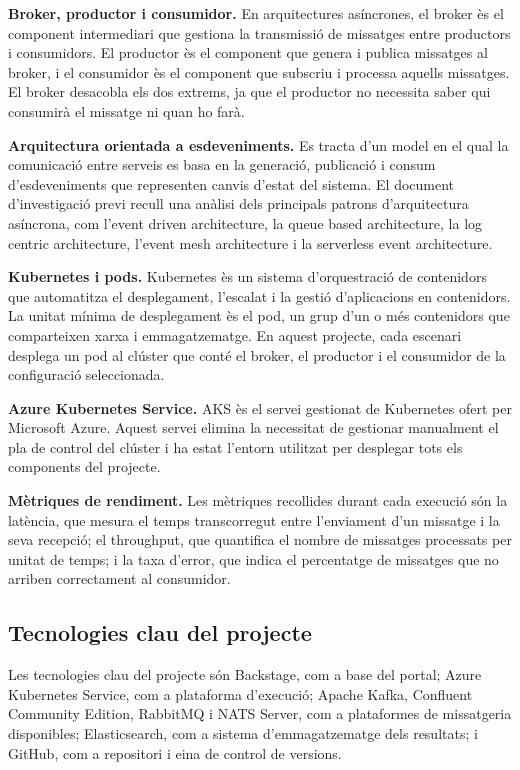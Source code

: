 \documentclass[11pt,a4paper]{article}
\begin{document}
\textbf{Broker, productor i consumidor.} En arquitectures as\'incrones, el broker \`es el component intermediari que gestiona la transmissi\'o de missatges entre productors i consumidors. El productor \`es el component que genera i publica missatges al broker, i el consumidor \`es el component que subscriu i processa aquells missatges. El broker desacobla els dos extrems, ja que el productor no necessita saber qui consumir\`a el missatge ni quan ho far\`a.

\textbf{Arquitectura orientada a esdeveniments.} Es tracta d'un model en el qual la comunicaci\'o entre serveis es basa en la generaci\'o, publicaci\'o i consum d'esdeveniments que representen canvis d'estat del sistema. El document d'investigaci\'o previ recull una an\`alisi dels principals patrons d'arquitectura as\'incrona, com l'event driven architecture, la queue based architecture, la log centric architecture, l'event mesh architecture i la serverless event architecture.

\textbf{Kubernetes i pods.} Kubernetes \`es un sistema d'orquestraci\'o de contenidors que automatitza el desplegament, l'escalat i la gesti\'o d'aplicacions en contenidors. La unitat m\'inima de desplegament \`es el pod, un grup d'un o m\'es contenidors que comparteixen xarxa i emmagatzematge. En aquest projecte, cada escenari desplega un pod al cl\'uster que cont\'e el broker, el productor i el consumidor de la configuraci\'o seleccionada.

\textbf{Azure Kubernetes Service.} AKS \`es el servei gestionat de Kubernetes ofert per Microsoft Azure. Aquest servei elimina la necessitat de gestionar manualment el pla de control del cl\'uster i ha estat l'entorn utilitzat per desplegar tots els components del projecte.

\textbf{M\`etriques de rendiment.} Les m\`etriques recollides durant cada execuci\'o s\'on la lat\`encia, que mesura el temps transcorregut entre l'enviament d'un missatge i la seva recepci\'o; el throughput, que quantifica el nombre de missatges processats per unitat de temps; i la taxa d'error, que indica el percentatge de missatges que no arriben correctament al consumidor.

\subsection{Tecnologies clau del projecte}
Les tecnologies clau del projecte s\'on Backstage, com a base del portal; Azure Kubernetes Service, com a plataforma d'execuci\'o; Apache Kafka, Confluent Community Edition, RabbitMQ i NATS Server, com a plataformes de missatgeria disponibles; Elasticsearch, com a sistema d'emmagatzematge dels resultats; i GitHub, com a repositori i eina de control de versions.
\end{document}
